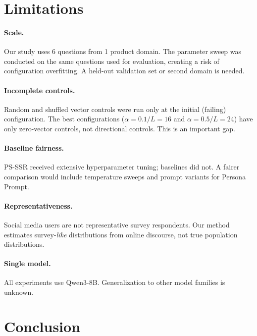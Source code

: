 \documentclass[letterpaper]{article}
\newcommand{\method}{PS-SSR}
\begin{document}
\section{Limitations}
\label{sec:limitations}

\paragraph{Scale.} Our study uses 6 questions from 1 product domain. The parameter sweep was conducted on the same questions used for evaluation, creating a risk of configuration overfitting. A held-out validation set or second domain is needed.

\paragraph{Incomplete controls.} Random and shuffled vector controls were run only at the initial (failing) configuration. The best configurations ($\alpha=0.1/L=16$ and $\alpha=0.5/L=24$) have only zero-vector controls, not directional controls. This is an important gap.

\paragraph{Baseline fairness.} \method{} received extensive hyperparameter tuning; baselines did not. A fairer comparison would include temperature sweeps and prompt variants for Persona Prompt.

\paragraph{Representativeness.} Social media users are not representative survey respondents. Our method estimates survey-\emph{like} distributions from online discourse, not true population distributions.

\paragraph{Single model.} All experiments use Qwen3-8B. Generalization to other model families is unknown.

\section{Conclusion}
\label{sec:conclusion}
\end{document}
